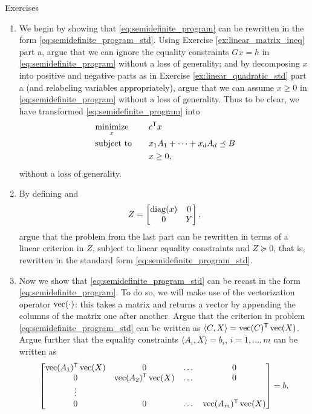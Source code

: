 \begin{xcb}{Exercises}
\begin{enumerate}[label=\thechapter.\arabic*]
\begin{enumerate}[label=\alph*.]
\item We begin by showing that \eqref{eq:semidefinite_program} can be 
  rewritten in the form \eqref{eq:semidefinite_program_std}. Using Exercise  
  \ref{ex:linear_matrix_ineq} part a, argue that we can ignore the equality
  constraints $Gx = h$ in \eqref{eq:semidefinite_program} without a loss of
  generality; and by decomposing $x$ into positive and negative parts as in
  Exercise \ref{ex:linear_quadratic_std} part a (and relabeling variables
  appropriately), argue that we can assume $x \geq 0$ in
  \eqref{eq:semidefinite_program} without a loss of generality. Thus to be
  clear, we have transformed \eqref{eq:semidefinite_program} into  
  \begin{alignat*}{2}
  &\operatorname*{minimize}_x \quad && c^{\mathsf{T}} x \\
  &\operatorname{subject\,\,to} \quad && x_1A_1 + \cdots + x_d A_d \preceq B \\  
  & && x \geq 0,
  \end{alignat*}
  without a loss of generality. 

\item By defining  and 
  \[
  Z = \begin{bmatrix} \operatorname{diag}(x) & 0 \\ 0 & Y \end{bmatrix},
  \]
  argue that the problem from the last part can be rewritten in terms of a
  linear criterion in $Z$, subject to linear equality constraints and $Z \succeq
  0$, that is, rewritten in the standard form
  \eqref{eq:semidefinite_program_std}.       

\item Now we show that \eqref{eq:semidefinite_program_std} can be recast in
  the form \eqref{eq:semidefinite_program}. To do so, we will make use of the
  vectorization operator $\operatorname{vec}(\cdot)$: this takes a matrix and returns a
  vector by appending the columns of the matrix one after another. Argue that
  the criterion in problem \eqref{eq:semidefinite_program_std} can be written as 
  $\langle C, X \rangle = \operatorname{vec}(C)^{\mathsf{T}} \operatorname{vec}(X)$. Argue further that the equality
  constraints $\langle A_i, X \rangle = b_i$, $i=1,\dots,m$ can be written as
  \[
  \begin{bmatrix}
  \operatorname{vec}(A_1)^{\mathsf{T}} \operatorname{vec}(X) & 0 & \dots & 0 \\
  0 & \operatorname{vec}(A_2)^{\mathsf{T}} \operatorname{vec}(X) & \dots & 0 \\
  \vdots & & & \\
  0 & 0 & \dots & \operatorname{vec}(A_m)^{\mathsf{T}} \operatorname{vec}(X) \\
  \end{bmatrix} = b.
  \]


\end{enumerate}
\end{enumerate}
\end{xcb}
